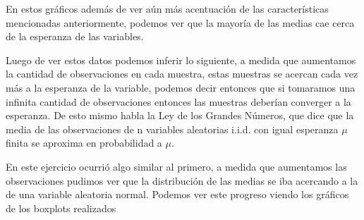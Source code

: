 \documentclass[a4paper]{article}
\begin{document}
\begin{figure}[H]
	\end{figure}
	
	En estos gr\'aficos además de ver a\'un m\'as acentuaci\'on de las caracter\'isticas mencionadas anteriormente, podemos ver que la mayor\'ia de las medias cae cerca de la esperanza de las variables.
	
	Luego de ver estos datos podemos inferir lo siguiente, a medida que aumentamos la cantidad de observaciones en cada muestra, estas muestras se acercan cada vez m\'as a la esperanza de la variable, podemos decir entonces que si tomaramos una infinita cantidad de observaciones entonces las muestras deber\'ian converger a la esperanza. De esto mismo habla la Ley de los Grandes N\'umeros, que dice que la media de las observaciones de n variables aleatorias i.i.d. con igual esperanza $\mu$ finita se aproxima en probabilidad a $\mu$.
	
	En este ejercicio ocurri\'o algo similar al primero, a medida que aumentamos las observaciones pudimos ver que la distribuci\'on de las medias se iba acercando a la de una variable aleatoria normal.
	Podemos ver este progreso viendo los gr\'aficos de los boxplots realizados
	
\end{document}
